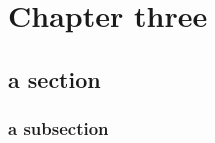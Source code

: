 \chapter{Chapter three}



\lipsum

\section{a section}

\lipsum

\subsection{a subsection}

\lipsum